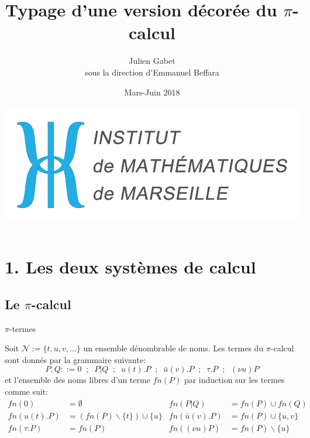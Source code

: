 \documentclass[11pt]{beamer}
\author{Julien Gabet\\
sous la direction d'Emmanuel Beffara}
\title{Typage d'une version décorée du $\pi$-calcul}
\institute{Institut de Mathématiques de Marseille}
\date{Mars-Juin 2018\\~\\
\includegraphics[scale=0.1]{institutMathMarseille.jpg}}
\newcommand{\NN}{\ensuremath{\mathcal{N}}\xspace}
\begin{document}
\begin{frame}
\titlepage
\end{frame}


\begin{frame}
\tableofcontents
\end{frame}

\section{1. Les deux systèmes de calcul}
\subsection{Le $\pi$-calcul}

\begin{frame}{$\pi$-termes}
\begin{definition}
Soit $\NN:=\{t,u,v,\ldots\}$ un ensemble dénombrable de noms. Les termes du $\pi$-calcul sont donnés par la grammaire suivante:
\[P,Q::=0\;\;;\;\;P|Q\;\;;\;\;u(t).P\;\;;\;\;\bar{u}(v).P\;\;;\;\;\tau.P\;\;;\;\;(\nu u)P\]
et l'ensemble des noms libres d'un terme $fn(P)$ par induction sur les termes comme suit:
\begin{align*}
fn(0)&=\emptyset & fn(P|Q)&=fn(P)\cup fn(Q) \\
fn(u(t).P)&=(fn(P)\backslash\{t\})\cup\{u\} & fn(\bar{u}(v).P)&=fn(P)\cup\{u,v\} \\
fn(\tau.P)&=fn(P) & fn((\nu u)P)&=fn(P)\backslash\{u\}
\end{align*}
\end{definition}
\end{frame}
\end{document}
